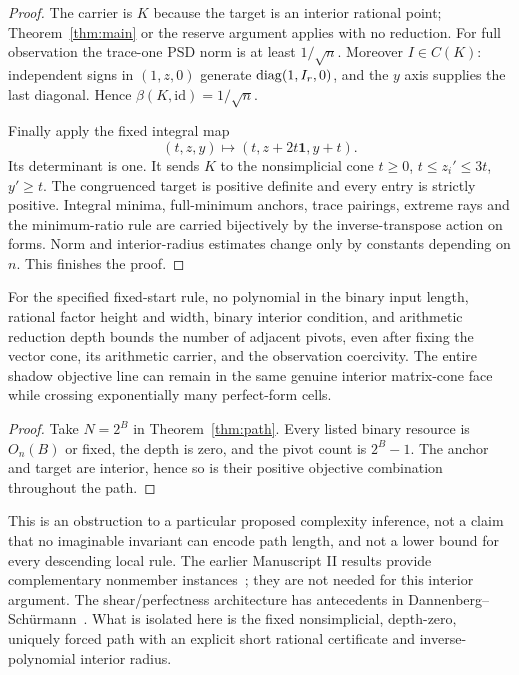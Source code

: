 \begin{proof}
The carrier is $K$ because the target is an interior rational point; Theorem~\ref{thm:main} or the reserve argument applies with no reduction. For full observation the trace-one PSD norm is at least $1/\sqrt n$. Moreover $I\in C(K)$: independent signs in $(1,z,0)$ generate $\operatorname{diag}(1,I_r,0)$, and the $y$ axis supplies the last diagonal. Hence $\beta(K,\mathrm{id})=1/\sqrt n$.

Finally apply the fixed integral map
\[
 (t,z,y)\longmapsto(t,z+2t\mathbf1,y+t).
\]
Its determinant is one. It sends $K$ to the nonsimplicial cone $t\ge0$, $t\le z_i'\le3t$, $y'\ge t$. The congruenced target is positive definite and every entry is strictly positive. Integral minima, full-minimum anchors, trace pairings, extreme rays and the minimum-ratio rule are carried bijectively by the inverse-transpose action on forms. Norm and interior-radius estimates change only by constants depending on $n$. This finishes the proof.
\end{proof}

\begin{corollary}\label{cor:barrier}
For the specified fixed-start rule, no polynomial in the binary input length, rational factor height and width, binary interior condition, and arithmetic reduction depth bounds the number of adjacent pivots, even after fixing the vector cone, its arithmetic carrier, and the observation coercivity. The entire shadow objective line can remain in the same genuine interior matrix-cone face while crossing exponentially many perfect-form cells.
\end{corollary}
\begin{proof}
Take $N=2^B$ in Theorem~\ref{thm:path}. Every listed binary resource is $O_n(B)$ or fixed, the depth is zero, and the pivot count is $2^B-1$. The anchor and target are interior, hence so is their positive objective combination throughout the path.
\end{proof}

This is an obstruction to a particular proposed complexity inference, not a claim that no imaginable invariant can encode path length, and not a lower bound for every descending local rule. The earlier Manuscript II results provide complementary nonmember instances~\cite{M2prior}; they are not needed for this interior argument. The shear/perfectness architecture has antecedents in Dannenberg--Sch\"urmann~\cite{DS23}. What is isolated here is the fixed nonsimplicial, depth-zero, uniquely forced path with an explicit short rational certificate and inverse-polynomial interior radius.

